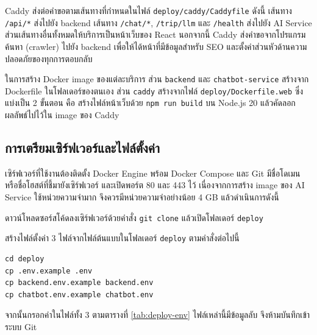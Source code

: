 Caddy ส่งต่อคำขอตามเส้นทางที่กำหนดในไฟล์ \texttt{deploy/caddy/Caddyfile} ดังนี้ เส้นทาง \texttt{/api/*} ส่งไปยัง backend เส้นทาง \texttt{/chat/*}, \texttt{/trip/llm} และ \texttt{/health} ส่งไปยัง AI Service ส่วนเส้นทางอื่นทั้งหมดให้บริการเป็นหน้าเว็บของ React นอกจากนี้ Caddy ส่งคำขอจากโปรแกรมค้นหา (crawler) ไปยัง backend เพื่อให้ได้หน้าที่มีข้อมูลสำหรับ SEO และตั้งค่าส่วนหัวด้านความปลอดภัยของทุกการตอบกลับ

ในการสร้าง Docker image ของแต่ละบริการ ส่วน \texttt{backend} และ \texttt{chatbot-service} สร้างจาก Dockerfile ในโฟลเดอร์ของตนเอง ส่วน \texttt{caddy} สร้างจากไฟล์ \texttt{deploy/Dockerfile.web} ซึ่งแบ่งเป็น 2 ขั้นตอน คือ สร้างไฟล์หน้าเว็บด้วย \texttt{npm run build} บน Node.js 20 แล้วคัดลอกผลลัพธ์ไปไว้ใน image ของ Caddy

\subsection{การเตรียมเซิร์ฟเวอร์และไฟล์ตั้งค่า}

เซิร์ฟเวอร์ที่ใช้งานต้องติดตั้ง Docker Engine พร้อม Docker Compose และ Git มีชื่อโดเมนหรือชื่อโฮสต์ที่ชี้มายังเซิร์ฟเวอร์ และเปิดพอร์ต 80 และ 443 ไว้ เนื่องจากการสร้าง image ของ AI Service ใช้หน่วยความจำมาก จึงควรมีหน่วยความจำอย่างน้อย 4 GB แล้วดำเนินการดังนี้

\begin{numlist}
\item ดาวน์โหลดซอร์สโค้ดลงเซิร์ฟเวอร์ด้วยคำสั่ง \texttt{git clone} แล้วเปิดโฟลเดอร์ \texttt{deploy}
\item สร้างไฟล์ตั้งค่า 3 ไฟล์จากไฟล์ต้นแบบในโฟลเดอร์ \texttt{deploy} ตามคำสั่งต่อไปนี้
\end{numlist}

\begin{codeblock}
\begin{lstlisting}[numbers=none]
cd deploy
cp .env.example .env
cp backend.env.example backend.env
cp chatbot.env.example chatbot.env
\end{lstlisting}
\end{codeblock}

จากนั้นกรอกค่าในไฟล์ทั้ง 3 ตามตารางที่ \ref{tab:deploy-env} ไฟล์เหล่านี้มีข้อมูลลับ จึงห้ามบันทึกเข้าระบบ Git

